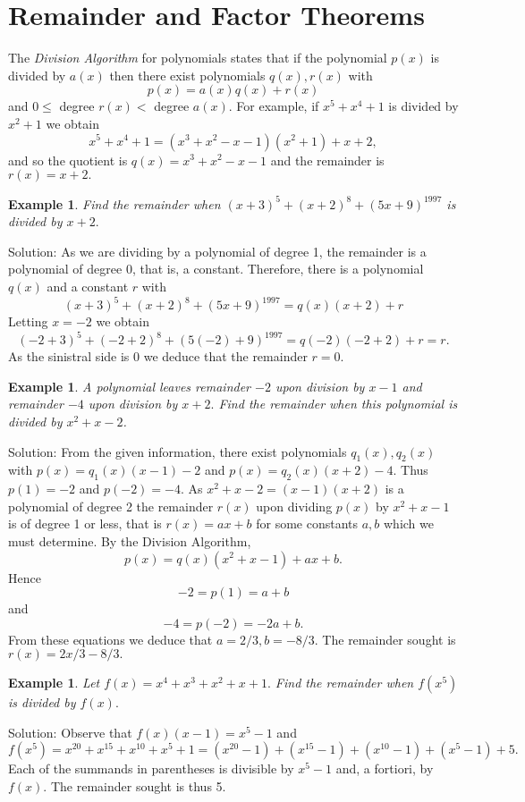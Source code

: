 \documentclass[11pt, openany]{book}
\theoremstyle{change} \theoremheaderfont{\blue\sffamily\bfseries}
\newtheorem{exa}[thm]{Example}
\theoremstyle{nonumberplain} \theoremheaderfont{\sffamily\bfseries}
\newcommand{\í}{\'{\i}}
\begin{document}
\section{Remainder and Factor Theorems} The {\em
Division Algorithm} for polynomials states that if the polynomial
$p(x)$ is divided by $a(x)$ then there exist polynomials  $q(x),
r(x)$  with
\begin{equation}
p(x) = a(x)q(x) + r(x)\end{equation} and  $0 \leq$ degree $r(x) <$
degree $a(x)$. For example, if $x^5 + x^4 + 1$ is divided by $x^2
+ 1$ we obtain
$$x^5 + x^4 + 1 = (x^3 + x^2 - x - 1)(x^2 + 1) + x + 2,$$and so the quotient is
$q(x) = x^3 + x^2 - x - 1$ and the remainder is $r(x) = x + 2.$
\begin{exa} Find the remainder when $(x + 3)^5 + (x + 2)^8 + (5x + 9)^{1997}$ is divided by
$x + 2.$ \end{exa} Solution: As we are dividing by a polynomial of
degree 1, the remainder is a polynomial of degree 0, that is, a
constant. Therefore, there is a polynomial  $q(x)$ and a constant
$r$ with
$$
(x + 3)^5 + (x + 2)^8 + (5x + 9)^{1997} = q(x)(x + 2) + r
$$Letting  $x = - 2$ we obtain
$$(-2 + 3)^5 + (-2 + 2)^8 + (5(-2) + 9)^{1997} = q(-2)(-2 + 2) + r = r. $$As the sinistral side
is 0 we deduce that the remainder $r = 0$.
\begin{exa} A polynomial leaves remainder $-2$ upon division by $x - 1$ and remainder
$-4$ upon division by $x + 2.$ Find the remainder when this
polynomial is divided by $x^2 + x - 2$.  \end{exa} Solution: From
the given information, there exist polynomials $q_1(x), q_2(x)$
with $p(x) = q_1(x)(x - 1) - 2$ and $p(x) = q_2(x)(x + 2) - 4.$
Thus $p(1) = -2$ and $p(-2) = - 4.$ As $x^2 + x - 2 = (x - 1)(x +
2)$ is a polynomial of degree 2 the remainder $r(x)$ upon dividing
$p(x)$ by $x^2 + x - 1$ is of degree 1 or less, that is $r(x) = ax
+ b$ for some constants $a, b$ which we must determine. By the
Division Algorithm,
$$p(x) = q(x)(x^2 + x - 1) + ax + b.$$Hence
$$- 2 = p(1) = a + b$$and $$- 4 = p(-2) = -2a + b.$$From these equations we deduce that
$a = 2/3, b = -8/3.$ The remainder sought is $r(x) = 2x/3 - 8/3.$
\begin{exa}
Let $f(x) = x^4 + x^3 + x^2 + x + 1.$ Find the remainder when
$f(x^5)$ is divided by $f(x).$
\end{exa}
Solution: Observe that $f(x)(x - 1) = x^5 - 1$ and
$$f(x^5) = x^{20} + x^{15} + x^{10} + x^5 + 1 = (x^{20} - 1) + (x^{15} - 1) + (x^{10} - 1)
+ (x^5 - 1) + 5.$$ Each of the summands in parentheses is
divisible by $x^5 - 1$ and, a fortiori, by $f(x).$ The remainder
sought is thus 5.
\end{document}
